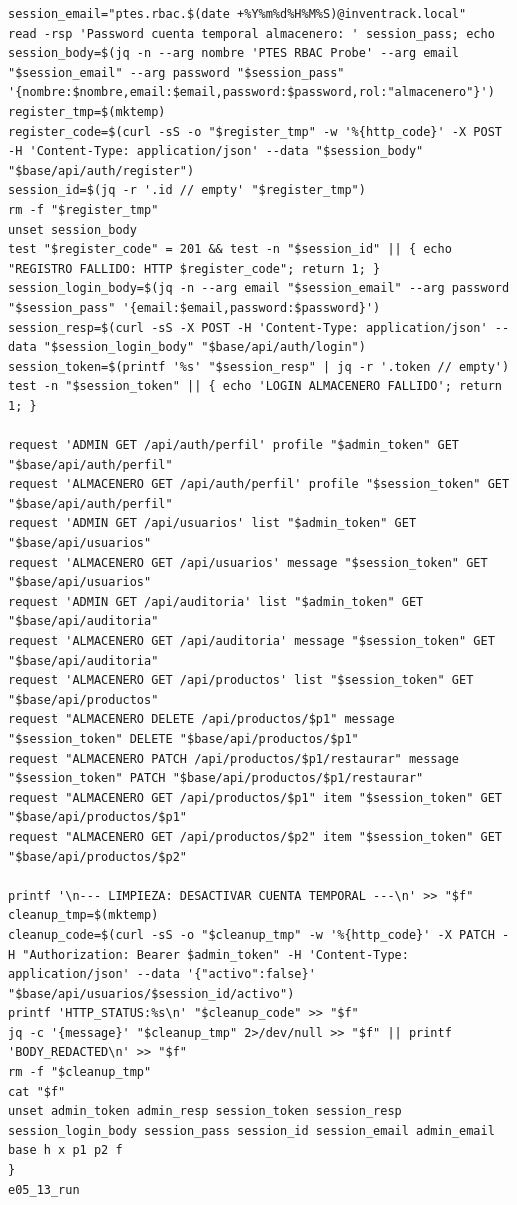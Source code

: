 \begin{tcolorbox}[codebox]
\begin{Verbatim}[fontsize=\scriptsize,breaklines=true,breakanywhere=true]
session_email="ptes.rbac.$(date +%Y%m%d%H%M%S)@inventrack.local"
read -rsp 'Password cuenta temporal almacenero: ' session_pass; echo
session_body=$(jq -n --arg nombre 'PTES RBAC Probe' --arg email "$session_email" --arg password "$session_pass" '{nombre:$nombre,email:$email,password:$password,rol:"almacenero"}')
register_tmp=$(mktemp)
register_code=$(curl -sS -o "$register_tmp" -w '%{http_code}' -X POST -H 'Content-Type: application/json' --data "$session_body" "$base/api/auth/register")
session_id=$(jq -r '.id // empty' "$register_tmp")
rm -f "$register_tmp"
unset session_body
test "$register_code" = 201 && test -n "$session_id" || { echo "REGISTRO FALLIDO: HTTP $register_code"; return 1; }
session_login_body=$(jq -n --arg email "$session_email" --arg password "$session_pass" '{email:$email,password:$password}')
session_resp=$(curl -sS -X POST -H 'Content-Type: application/json' --data "$session_login_body" "$base/api/auth/login")
session_token=$(printf '%s' "$session_resp" | jq -r '.token // empty')
test -n "$session_token" || { echo 'LOGIN ALMACENERO FALLIDO'; return 1; }

request 'ADMIN GET /api/auth/perfil' profile "$admin_token" GET "$base/api/auth/perfil"
request 'ALMACENERO GET /api/auth/perfil' profile "$session_token" GET "$base/api/auth/perfil"
request 'ADMIN GET /api/usuarios' list "$admin_token" GET "$base/api/usuarios"
request 'ALMACENERO GET /api/usuarios' message "$session_token" GET "$base/api/usuarios"
request 'ADMIN GET /api/auditoria' list "$admin_token" GET "$base/api/auditoria"
request 'ALMACENERO GET /api/auditoria' message "$session_token" GET "$base/api/auditoria"
request 'ALMACENERO GET /api/productos' list "$session_token" GET "$base/api/productos"
request "ALMACENERO DELETE /api/productos/$p1" message "$session_token" DELETE "$base/api/productos/$p1"
request "ALMACENERO PATCH /api/productos/$p1/restaurar" message "$session_token" PATCH "$base/api/productos/$p1/restaurar"
request "ALMACENERO GET /api/productos/$p1" item "$session_token" GET "$base/api/productos/$p1"
request "ALMACENERO GET /api/productos/$p2" item "$session_token" GET "$base/api/productos/$p2"

printf '\n--- LIMPIEZA: DESACTIVAR CUENTA TEMPORAL ---\n' >> "$f"
cleanup_tmp=$(mktemp)
cleanup_code=$(curl -sS -o "$cleanup_tmp" -w '%{http_code}' -X PATCH -H "Authorization: Bearer $admin_token" -H 'Content-Type: application/json' --data '{"activo":false}' "$base/api/usuarios/$session_id/activo")
printf 'HTTP_STATUS:%s\n' "$cleanup_code" >> "$f"
jq -c '{message}' "$cleanup_tmp" 2>/dev/null >> "$f" || printf 'BODY_REDACTED\n' >> "$f"
rm -f "$cleanup_tmp"
cat "$f"
unset admin_token admin_resp session_token session_resp session_login_body session_pass session_id session_email admin_email base h x p1 p2 f
}
e05_13_run
\end{Verbatim}
\end{tcolorbox}

